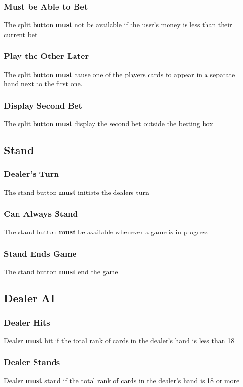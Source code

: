\documentclass{article}
\begin{document}
\subsubsection{\textbf{Must} be Able to Bet}The split button \textbf{must} not be available if the user’s money is less than their current bet%
\subsubsection{Play the Other Later}The split button \textbf{must} cause one of the players cards to appear in a separate hand next to the first one.
\subsubsection{Display Second Bet}The split button \textbf{must} display the second bet outside the betting box
\subsection{ Stand }
\subsubsection{Dealer's Turn}The stand button \textbf{must} initiate the dealers turn
\subsubsection{Can Always Stand}The stand button \textbf{must} be available whenever a game is in progress
\subsubsection{Stand Ends Game} The stand button \textbf{must} end the game
\subsection{ Dealer AI}
\subsubsection{Dealer Hits}Dealer \textbf{must} hit if the total rank of cards in the dealer's hand is less than 18
\subsubsection{Dealer Stands}Dealer \textbf{must} stand if the total rank of cards in the dealer's hand is 18 or more
\end{document}
